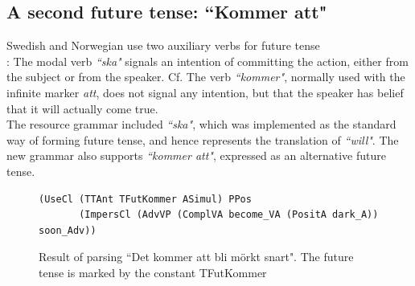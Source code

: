 \documentclass{report}
\begin{document}
\subsection{A second future tense: ``Kommer att"}
Swedish and Norwegian use two auxiliary verbs for future tense \\
\cite[p. 246]{H&H}:
The modal verb \emph{``ska"} signals an intention of committing the action, either from the subject or from
the speaker. Cf.
The verb \emph{``kommer"}, normally used with the infinite marker \emph{att},
does not signal any intention, but that the speaker has belief that 
it will actually come true.\\
The resource grammar included 
\emph{``ska"}, which was implemented as the standard way of forming future
tense, and hence represents the translation of
\emph{``will"}. 
The new grammar also supports \emph{``kommer att"}, expressed as an alternative
future tense.
\begin{figure}[h]
\begin{verbatim}
(UseCl (TTAnt TFutKommer ASimul) PPos 
       (ImpersCl (AdvVP (ComplVA become_VA (PositA dark_A)) soon_Adv))
\end{verbatim}
\caption{Result of parsing ``Det kommer att bli mörkt snart". The future tense
         is marked by the constant TFutKommer}
  \label{fig:kommeratt}
\end{figure}
\end{document}
